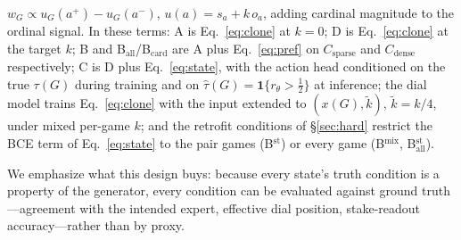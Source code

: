 \documentclass[11pt]{article}
\begin{document}
$w_G \propto u_G(a^{+}) - u_G(a^{-})$, $u(a) = s_a + k\,o_a$, adding cardinal magnitude to
the ordinal signal. In these terms: A is Eq.~\eqref{eq:clone} at $k{=}0$; D is
Eq.~\eqref{eq:clone} at the target $k$; B and B$_{\mathrm{all}}$/B$_{\mathrm{card}}$ are A plus
Eq.~\eqref{eq:pref} on $C_{\mathrm{sparse}}$ and $C_{\mathrm{dense}}$ respectively; C is
D plus Eq.~\eqref{eq:state}, with the action head conditioned on the true $\tau(G)$ during
training and on $\hat{\tau}(G) = \mathbf{1}\{r_\theta > \tfrac12\}$ at inference; the dial
model trains Eq.~\eqref{eq:clone} with the input extended to $(x(G), \tilde{k})$,
$\tilde{k} = k/4$, under mixed per-game $k$; and the retrofit conditions of \S\ref{sec:hard}
restrict the BCE term of Eq.~\eqref{eq:state} to the pair games (B$^{\mathrm{st}}$) or every
game (B$^{\mathrm{mix}}$, B$_{\mathrm{all}}^{\mathrm{st}}$).

We emphasize what this design buys: because every state's truth condition is a property of the
generator, every condition can be evaluated against ground truth---agreement with the intended
expert, effective dial position, stake-readout accuracy---rather than by proxy.
\end{document}
